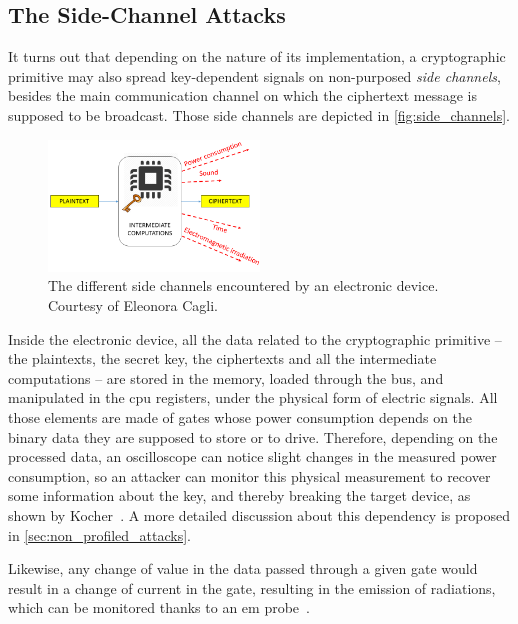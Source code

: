 \subsection{The Side-Channel Attacks}
It turns out that depending on the nature of its implementation, a cryptographic primitive may also spread key-dependent signals on non-purposed \emph{side channels}, besides the main communication channel on which the ciphertext message is supposed to be broadcast.
Those side channels are depicted in \autoref{fig:side_channels}.
\begin{figure}
	\centering
	\includegraphics[width=0.5\textwidth]{Figures/channels}
	\caption{The different side channels encountered by an electronic device.
	Courtesy of Eleonora Cagli.}
	\label{fig:side_channels}
\end{figure}
Inside the electronic device, all the data related to the cryptographic primitive -- \ie{} the plaintexts, the secret key, the ciphertexts and all the intermediate computations -- are stored in the memory, loaded through the bus, and manipulated in the \gls{cpu} registers, under the physical form of electric signals.
All those elements are made of gates whose power consumption depends on the binary data they are supposed to store or to drive.
Therefore, depending on the processed data, an oscilloscope can notice slight changes in the measured power consumption, so an attacker can monitor this physical measurement to recover some information about the key, and thereby breaking the target device, as shown by Kocher~\cite{kocher_dpa_1999}.
A more detailed discussion about this dependency is proposed in \autoref{sec:non_profiled_attacks}.

Likewise, any change of value in the data passed through a given gate would result in a change of current in the gate, resulting in the emission of  radiations, which can be monitored thanks to an \gls{em} probe~\cite{gandolfi_electro_2001,quisquater_ema_2001}.

